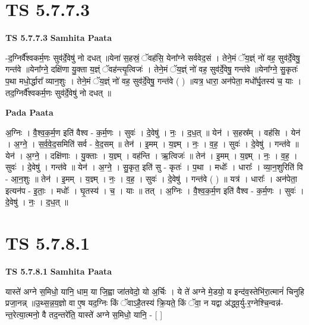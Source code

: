\documentclass[17pt]{extarticle}
\begin{document}
\section*{ TS 5.7.7.3 }

\textbf{TS 5.7.7.3 } \newline
\textbf{Samhita Paata} \newline

-द॒ग्निर्वै᳚श्वकर्म॒णः सुव॑र्दे॒वेषु॑ नो दधत् ॥येना॑ स॒हस्रं॒ ॅवह॑सि॒ येना᳚ग्ने सर्ववेद॒सं । तेने॒मं ॅय॒ज्ञ्ं नो॑ वह॒ सुव॑र्दे॒वेषु॒ गन्त॑वे ॥येना᳚ग्ने॒ दक्षि॑णा यु॒क्ता य॒ज्ञ्ं ॅवह॑न्त्यृ॒त्विजः॑ । तेने॒मं ॅय॒ज्ञ्ं नो॑ वह॒ सुव॑र्दे॒वेषु॒ गन्त॑वे ॥येना᳚ग्ने॒ सु॒कृतः॑ प॒था मधो॒र्द्धारा᳚ व्यान॒शुः । तेने॒मं ॅय॒ज्ञ्ं नो॑ वह॒ सुव॑र्दे॒वेषु॒ गन्त॑वे ( ) ॥यत्र॒ धारा॒ अन॑पेता॒ मधो᳚र्घृ॒तस्य॑ च॒ याः । तद॒ग्निर्वै᳚श्वकर्म॒णः सुव॑र्दे॒वेषु॑ नो दधत् ॥ \newline

\textbf{Pada Paata} \newline

अ॒ग्निः । वै॒श्व॒क॒र्म॒ण इति॑ वैश्व - क॒र्म॒णः । सुवः॑ । दे॒वेषु॑ । नः॒ । द॒ध॒त् ॥ येन॑ । स॒हस्र᳚म् । वह॑सि । येन॑ । अ॒ग्ने॒ । स॒र्व॒वे॒द॒समिति॑ सर्व - वे॒द॒सम् ॥ तेन॑ । इ॒मम् । य॒ज्ञ्म् । नः॒ । व॒ह॒ । सुवः॑ । दे॒वेषु॑ । गन्त॑वे ॥ येन॑ । अ॒ग्ने॒ । दक्षि॑णाः । यु॒क्ताः । य॒ज्ञ्म् । वह॑न्ति । ऋ॒त्विजः॑ ॥ तेन॑ । इ॒मम् । य॒ज्ञ्म् । नः॒ । व॒ह॒ । सुवः॑ । दे॒वेषु॑ । गन्त॑वे ॥ येन॑ । अ॒ग्ने॒ । सु॒कृत॒ इति॑ सु - कृतः॑ । प॒था । मधोः᳚ । धाराः᳚ । व्या॒न॒शुरिति॑ वि - आ॒न॒शुः ॥ तेन॑ । इ॒मम् । य॒ज्ञ्म् । नः॒ । व॒ह॒ । सुवः॑ । दे॒वेषु॑ । गन्त॑वे ( ) ॥ यत्र॑ । धाराः᳚ । अन॑पेता॒ इत्यन॑प - इ॒ताः॒ । मधोः᳚ । घृ॒तस्य॑ । च॒ । याः ॥ तत् । अ॒ग्निः । वै॒श्व॒क॒र्म॒ण इति॑ वैश्व - क॒र्म॒णः । सुवः॑ । दे॒वेषु॑ । नः॒ । द॒ध॒त् ॥  \newline




\section*{ TS 5.7.8.1 }

\textbf{TS 5.7.8.1 } \newline
\textbf{Samhita Paata} \newline

यास्ते॑ अग्ने स॒मिधो॒ यानि॒ धाम॒ या जि॒ह्वा जा॑तवेदो॒ यो अ॒र्चिः । ये ते॑ अग्ने मे॒डयो॒ य इन्द॑व॒स्तेभि॑रा॒त्मानं॑ चिनुहि प्रजा॒नन्न् ॥उ॒थ्स॒न्न॒य॒ज्ञो वा ए॒ष यद॒ग्निः किं ॅवाऽहै॒तस्य॑ क्रि॒यते॒ किं ॅवा॒ न यद्वा अ॑द्ध्व॒र्यु-र॒ग्नेश्चि॒न्वन्न॑-न्त॒रेत्या॒त्मनो॒ वै तद॒न्तरे॑ति॒ यास्ते॑ अग्ने स॒मिधो॒ यानि॒ - [  ] \newline
\end{document}
